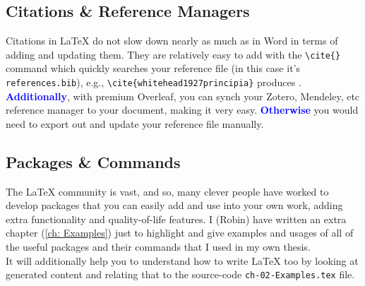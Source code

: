 \subsection{Citations \& Reference Managers}
Citations in \LaTeX{} do not slow down nearly as much as in Word in terms of adding and updating them. They are relatively easy to add with the \verb|\cite{}| command which quickly searches your reference file (in this case it's \verb|references.bib|), e.g., \verb|\cite{whitehead1927principia}| produces \cite{whitehead1927principia}.
\textcolor{blue}{\textbf{Additionally}}, with premium Overleaf, you can synch your Zotero, Mendeley, etc reference manager to your document, making it very easy. \textcolor{blue}{\textbf{Otherwise}} you would need to export out and update your reference file manually.

\subsection{Packages \& Commands}
The \LaTeX{} community is vast, and so, many clever people have worked to develop packages that you can easily add and use into your own work, adding extra functionality and quality-of-life features.
I (Robin) have written an extra chapter (\cref{ch: Examples}) just to highlight and give examples and usages of all of the useful packages and their commands that I used in my own thesis.\\
It will additionally help you to understand how to write \LaTeX{} too by looking at generated content and relating that to the source-code \verb|ch-02-Examples.tex| file.